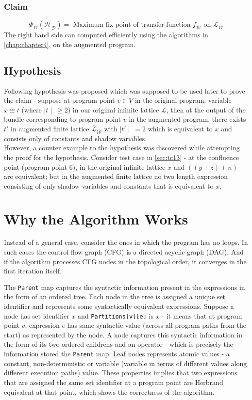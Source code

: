 \subsubsection{Claim}
\label{subsubsec:Claim}
$$\Phi_{\overline{W}}(\overline{\mathcal{H}}_{\overline{\mathcal{D}}}) =\text{ Maximum fix point of transfer function } \overline{f}_{\overline{\mathcal{W}}} \text{ on } \overline{\mathcal{L}}_{\overline{\mathcal{W}}}$$
The right hand side can computed efficiently using the algorithms in \autoref{chap:chapter4}, on the augmented program.

\subsection{Hypothesis}
\label{subsec:Hypothesis}
Following hypothesis was proposed which was supposed to be used later to prove the claim - suppose at program point $v \in V$ in the original program, variable $x \cong t$ (where $\mid t \mid\ \geq 2$) in our original infinite lattice $\mathcal{L}$, then at the output of the bundle corresponding to program point $v$ in the augmented program, there exists $t'$ in augmented finite lattice $\overline{\mathcal{L}}_{\overline{\mathcal{W}}}$ with $\mid t' \mid\ = 2$ which is equivalent to $x$ and consists only of constants and shadow variables.
\\
However, a counter example to the hypothesis was discovered while attempting the proof for the hypothesis. Consider test case in \autoref{sec:tc13} - at the confluence point (program point 6), in the original infinite lattice $x$ and $((y + z) + n)$ are equivalent; but in the augmented finite lattice no two length expression consisting of only shadow variables and constants that is equivalent to $x$.

\section{Why the Algorithm Works}
\label{sec:WhyTheAlgorithmWorks}
Instead of a general case, consider the ones in which the program has no loops. In such cases the control flow graph (CFG) is a directed acyclic graph (DAG). And if the algorithm processes CFG nodes in the topological order, it converges in the first iteration itself.

The \texttt{Parent} map captures the syntactic information present in the expressions in the form of an ordered tree. Each node in the tree is assigned a unique set identifier and represents some syntactically equivalent expressions. Suppose a node has set identifier $x$ and \texttt{Partitions[v][e]} is $x$ - it means that at program point $v$, expression $e$ has same syntactic value (across all program paths from the start) as represented by the node. A node captures this syntactic information in the form of its two ordered childrens and an operator - which is precisely the information stored the \texttt{Parent} map. Leaf nodes represents atomic values - a constant, non-deterministic or variable (variable in terms of different values along different execution paths) value. These properties implies that two expressions that are assigned the same set identifier at a program point are Herbrand equivalent at that point, which shows the correctness of the algorithm.

